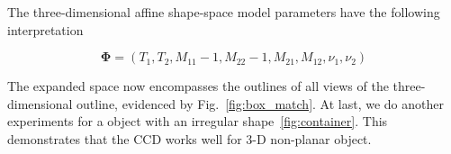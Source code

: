 The three-dimensional affine shape-space model parameters have
the following interpretation

\begin{equation}
  \label{eq:4.19}
  \mathbf{\Phi} =  (T_1, T_2, M_{11} - 1, M_{22} - 1, M_{21}, M_{12}, \nu_1, \nu_2)
\end{equation}

The expanded space now encompasses the outlines of all views of the three-dimensional
outline, evidenced by Fig.~\ref{fig:box_match}. At last, we do
another experiments for a object with an irregular shape~\ref{fig:container}. This
demonstrates that the CCD works well for 3-D non-planar object.

\begin{figure}[htbp] 
  \begin{minipage}[t]{0.5\linewidth} 
    \centering 
  \end{minipage}%
  \begin{minipage}[t]{0.5\linewidth} 
    \centering 
  \end{minipage} 
  \begin{minipage}[t]{0.5\linewidth} 
    \centering 

\end{minipage}
\end{figure}
